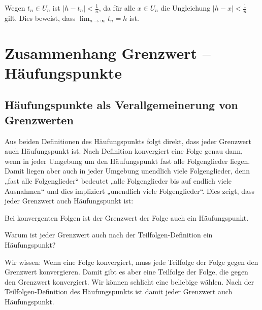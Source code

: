 \documentclass[fontsize=9pt,
               parskip=half-,
               DIV=14,
               listof=chapterentry,
               tocflat]{scrbook}
\newenvironment{indentblock}{\begin{adjustwidth}{.5cm}{}}{\end{adjustwidth}}
\begin{document}
\begin{proof*}
\begin{indentblock}
Wegen $t_{n}\in U_{n}$ ist $|h-t_{n}|<{\tfrac {1}{n}}$, da für alle $x\in U_{n}$ die Ungleichung $|h-x|<{\tfrac {1}{n}}$ gilt. Dies beweist, dass $\lim _{n\to \infty }t_{n}=h$ ist.

\end{indentblock}

\end{proof*}

\section{Zusammenhang Grenzwert – Häufungspunkte}

\subsection{Häufungspunkte als Verallgemeinerung von Grenzwerten}

Aus beiden Definitionen des Häufungspunkts folgt direkt, dass jeder Grenzwert auch Häufungspunkt ist. Nach Definition konvergiert eine Folge genau dann, wenn in jeder Umgebung um den Häufungspunkt fast alle Folgenglieder liegen. Damit liegen aber auch in jeder Umgebung unendlich viele Folgenglieder, denn „fast alle Folgenglieder“ bedeutet „alle Folgenglieder bis auf endlich viele Ausnahmen“ und dies impliziert „unendlich viele Folgenglieder“. Dies zeigt, dass jeder Grenzwert auch Häufungspunkt ist:

\begin{theorem*}
Bei konvergenten Folgen ist der Grenzwert der Folge auch ein Häufungspunkt.

\end{theorem*}

\begin{mdframed}[style=semanticbox,frametitleaboveskip=3pt,innerbottommargin=3pt,frametitle=Frage]
Warum ist jeder Grenzwert auch nach der Teilfolgen-Definition ein Häufungspunkt?

\end{mdframed}
\pagebreak
\begin{answer*}
Wir wissen: Wenn eine Folge konvergiert, muss jede Teilfolge der Folge gegen den Grenzwert konvergieren. Damit gibt es aber eine Teilfolge der Folge, die gegen den Grenzwert konvergiert. Wir können schlicht eine beliebige wählen. Nach der Teilfolgen-Definition des Häufungspunkts ist damit jeder Grenzwert auch Häufungspunkt.

\end{answer*}
\end{document}
